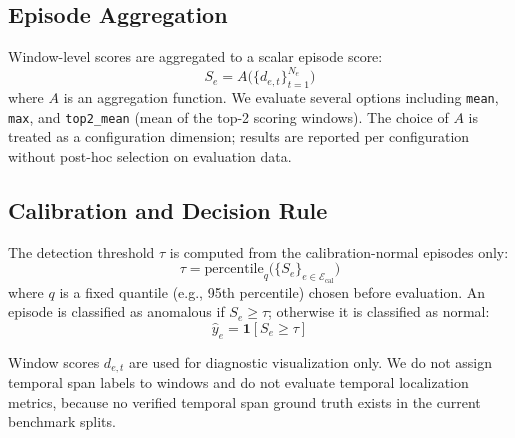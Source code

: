 \subsection{Episode Aggregation}

Window-level scores are aggregated to a scalar episode score:
\begin{equation}
  S_e = A\bigl(\{d_{e,t}\}_{t=1}^{N_e}\bigr)
  \label{eq:aggregation}
\end{equation}
where $A$ is an aggregation function. We evaluate several options including \texttt{mean},
\texttt{max}, and \texttt{top2\_mean} (mean of the top-2 scoring windows).
The choice of $A$ is treated as a configuration dimension; results are reported per
configuration without post-hoc selection on evaluation data.

\subsection{Calibration and Decision Rule}

The detection threshold $\tau$ is computed from the calibration-normal episodes only:
\begin{equation}
  \tau = \text{percentile}_{q}\bigl(\{S_e\}_{e \in \mathcal{E}_{\text{cal}}}\bigr)
  \label{eq:threshold}
\end{equation}
where $q$ is a fixed quantile (e.g., 95th percentile) chosen before evaluation.
An episode is classified as anomalous if $S_e \geq \tau$; otherwise it is classified as normal:
\begin{equation}
  \hat{y}_e = \mathbf{1}[S_e \geq \tau]
  \label{eq:decision}
\end{equation}

Window scores $d_{e,t}$ are used for diagnostic visualization only.
We do not assign temporal span labels to windows and do not evaluate temporal localization
metrics, because no verified temporal span ground truth exists in the current benchmark splits.
